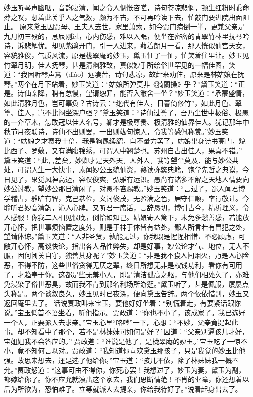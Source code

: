\documentclass[12pt,oneside]{book}
\begin{document}
妙玉听琴声幽咽，音韵凄清，闻之令人惆怅咨嗟，诗句苍凉悲惘，顿生红粉时乖命薄之叹，想着此关乎人之气数，颇为不吉，不可再吟读下去，忙敲门要进院出面阻止。
原来黛玉因贾母、王夫人去世，家里萧索，如今贾门病倒一半，更兼父亲是九月初三殁的，忌辰刚过，心内伤感，难以入眠，便坐在密密的青翠竹林里抚琴吟诗，诉悲解忧。却见紫鹃开门，引一人进来，藉着朗月一看，那人恍似仙宫天女，容貌雅俊，气质风流，原是栊翠庵的妙玉，黛玉怔了一怔，忙笑着往里让。妙玉见竹翠月明，佳人抚琴，甚是清幽雅致，真似妙手所绘俗世罕见的一幅佳图，笑道：“我因听琴声窵（diào）远凄苦，诗句悲凉，故赶来劝住，原来是林姑娘在抚琴。”两个在月下站着，妙玉笑道：“姑娘所弹莫非《猗蘭操》乎？”黛玉笑道：“正是。诗仙亲降，稍有怠慢，望请恕罪，能否入敝舍一坐？”妙玉笑道：“承蒙盛情，如此清雅月色，岂可辜负？古诗云：“绝代有佳人，日暮倚修竹”，如此月色、翠篁、佳人，岂不比闷坐深户强？”黛玉笑道：“诗仙过誉了，吾乃尘世中极俗、极愚的一介草木，怎敢冠以佳人名号，卿才是极尊贵、极清雅的仙界佳人。犹记那年中秋节月夜联诗，诗仙不出则罢，一出则竑句惊人，令我等感佩称赏。”妙玉笑道：“姑娘之才赛我十倍，我是狗尾续貂，自不量力罢了，姑娘出身诗书高门，貌比西子、罗敷，又有满腹锦绣，可谓人中翘楚也。苏州自古出佳人，果真不错。”
黛玉笑道：“此言差矣，妙卿才是天外天，人外人，我等望尘莫及，能与妙公共处，可谓人生一大快事，素闻妙公玉貌仙资，熟读弥繁典籍，饱学先哲之典谟，今日见了，果觉风神高迈，容仪俊爽，弘雅有远识。愚尚有诸多不解之天地人情要向妙公讨教，望妙公那日清闲了，对愚不吝赐教。”妙玉笑道：“言过了，鄙人闻君博学稽古，雅旷有智，克己恭俭，文词俊茂，无矜满之色，居守仁顺，率行敬让。今聆听君妙音清韵，沁人心脾。又听君一席话，言辞恳切，博引古今，精析理义，令人感服！你我二人相见恨晚，倒恰如知己。姑娘寄人篱下，未免多愁善感，若能放开心怀，把世事烦恼置之度外，则是于神于体皆有益处，鄙人所言若有冒犯之处，望请体谅。”黛玉笑道：“人非圣贤，孰能无过，你我既是惺惺相惜，不必顾虑，可敞开心怀，高谈快论，指出各人品性弊失，却是好事，妙公论才气、地位，无人不服，因何闭关自守，独善其身呢？”妙玉笑道：“非是我不食人间烟火，乃是人心险恶，不得不防，这些世俗贪得无厌之辈，终日所想无非是权钱功利，看你有可用了，才趋奉于你。这都是些无羞小人，即是清洁孤高之躯，与他们相处久了，亦难免浸染了俗世恶臭，故而我不肯到那名利场所游逛。”黛玉听了，甚是佩服，屡屡点头称是。两个谈叙良久，妙玉见时已夜深，便向黛玉告辞。两个依依惜别，妙玉又返回庵里去了。
话说贾政叫来宝玉，要他好好坐着：“别慌着走，有要紧话跟你说。”宝玉低首不语坐着，听他指示。贾政道：“你也不小了，该成家了。我已选好一个人，正要派人去求亲。”宝玉心里“咯噔”一下，心想：“不妙，父亲竟提起此事。却不知看中了那个，若不是林妹妹可如何是好？”因道：“父亲别逼孩儿才好，宝姐姐我不会答应的。”
贾政道：“谁说是他了，是栊翠庵的妙玉。”宝玉吃了一惊不小，竟不知何言以对。贾政道：“我知道你喜欢黛玉那孩子，只是我觉的妙玉比他强。故思来想去，还是选了他给你。”宝玉道：“孩儿不依，除了林妹妹我一概不允。”贾政怒道：“这事可由不得你，你死心罢！我想过了，妙玉为妻，黛玉为副，都嫁给你了。你不应允就滚出这个家去，我们恩断情绝！不肖的业障，你还想着以后为所欲为，恐怕难了。立等就派人去提亲，你给我待好了。”说着起身出去了。
\end{document}
